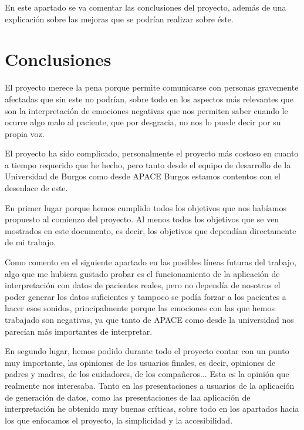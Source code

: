 
En este apartado se va comentar las conclusiones del proyecto, además de una explicación sobre las mejoras que se podrían realizar sobre éste.

\section{Conclusiones}
El proyecto merece la pena porque permite comunicarse con personas gravemente afectadas  que sin este no podrían, sobre todo en los aspectos más relevantes que son la interpretación de emociones negativas que nos permiten saber cuando le ocurre algo malo al paciente, que por desgracia, no nos lo puede decir por su propia voz.

El proyecto ha sido complicado, personalmente el proyecto más costoso en cuanto a tiempo requerido que he hecho, pero tanto desde el equipo de desarrollo de la Universidad de Burgos como desde APACE Burgos estamos contentos con el desenlace de este.

En primer lugar porque hemos cumplido todos los objetivos que nos habíamos propuesto al comienzo del proyecto. Al menos todos los objetivos que se ven mostrados en este documento, es decir, los objetivos que dependían directamente de mi trabajo. 

Como comento en el siguiente apartado en las posibles líneas futuras del trabajo, algo que me hubiera gustado probar es el funcionamiento de la aplicación de interpretación con datos de pacientes reales, pero no dependía de nosotros el poder generar los datos suficientes y tampoco se podía forzar a los pacientes a hacer esos sonidos, principalmente porque las emociones con las que hemos trabajado son negativas, ya que tanto de APACE como desde la universidad nos parecían más importantes de interpretar.

En segundo lugar, hemos podido durante todo el proyecto contar con un punto muy importante, las opiniones de los usuarios finales, es decir, opiniones de padres y madres, de los cuidadores, de los compañeros... Esta es la opinión que realmente nos interesaba. Tanto en las presentaciones a usuarios de la aplicación de generación de datos, como las presentaciones de laa aplicación de interpretación he obtenido muy buenas críticas, sobre todo en los apartados hacia los que enfocamos el proyecto, la simplicidad y la accesibilidad.

